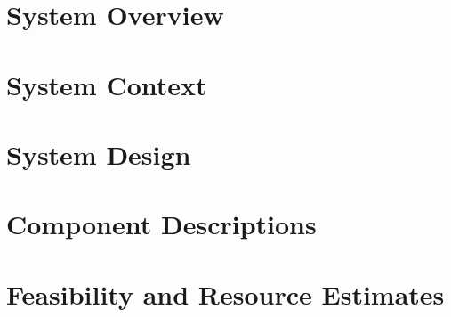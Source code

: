 \documentclass[11pt]{article}
\begin{document}
\section{System Overview}


\section{System Context}


\section{System Design}


\section{Component Descriptions}


\section{Feasibility and Resource Estimates}
\end{document}
